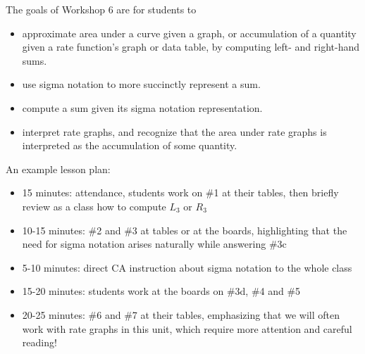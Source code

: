 \documentclass{article}
\begin{document}
\begin{workshop}
    The goals of Workshop 6 are for students to
    \begin{itemize}
        \item approximate area under a curve given a graph, or accumulation of a quantity given a rate function's graph or data table, by computing left- and right-hand sums.
        \item use sigma notation to more succinctly represent a sum. 
        \item compute a sum given its sigma notation representation.
        \item interpret rate graphs, and recognize that the area under rate graphs is interpreted as the accumulation of some quantity. 
    \end{itemize}
    An example lesson plan:
    \begin{itemize}
        \item 15 minutes: attendance, students work on \#1 at their tables, then briefly review as a class how to compute $L_3$ or $R_3$
        \item 10-15 minutes: \#2 and \#3 at tables or at the boards, highlighting that the need for sigma notation arises naturally while answering \#3c 
        \item 5-10 minutes: direct CA instruction about sigma notation to the whole class
        \item 15-20 minutes: students work at the boards on \#3d, \#4 and \#5
        \item 20-25 minutes: \#6 and \#7 at their tables, emphasizing that we will often work with rate graphs in this unit, which require more attention and careful reading!
        
        
    \end{itemize}
\end{workshop}
\end{document}
